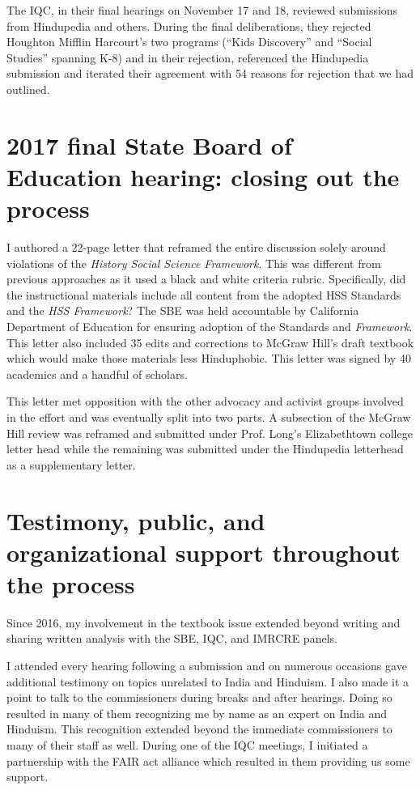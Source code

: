 The IQC, in their final hearings on November 17 and 18, reviewed submissions from Hindupedia and others. During the final deliberations, they rejected Houghton Mifflin Harcourt’s two programs (“Kids Discovery” and “Social Studies” spanning K-8) and in their rejection, referenced the Hindupedia submission and iterated their agreement with 54 reasons for rejection that we had outlined. 


\section*{2017 final State Board of Education hearing: closing out the process}

I authored a 22-page letter that reframed the entire discussion solely around violations of the \textit{History Social Science Framework}. This was different from previous approaches as it used a black and white criteria rubric. Specifically, did the instructional materials include all content from the adopted HSS Standards and the \textit{HSS Framework}? The SBE was held accountable by California Department of Education for ensuring adoption of the Standards and \textit{Framework}. This letter also included 35 edits and corrections to McGraw Hill’s draft textbook which would make those materials less Hinduphobic. This letter was signed by 40 academics and a handful of scholars. 

This letter met opposition with the other advocacy and activist groups involved in the effort and was eventually split into two parts. A subsection of the McGraw Hill review was reframed and submitted under Prof. Long’s Elizabethtown college letter head while the remaining was submitted under the Hindupedia letterhead as a supplementary letter.


\section*{Testimony, public, and organizational support throughout the process}

Since 2016, my involvement in the textbook issue extended beyond writing and sharing written analysis with the SBE, IQC, and IMRCRE panels. 

I attended every hearing following a submission and on numerous occasions gave additional testimony on topics unrelated to India and Hinduism. I also made it a point to talk to the commissioners during breaks and after hearings. Doing so resulted in many of them recognizing me by name as an expert on India and Hinduism. This recognition extended beyond the immediate commissioners to many of their staff as well. During one of the IQC meetings, I initiated a partnership with the FAIR act alliance which resulted in them providing us some support.

